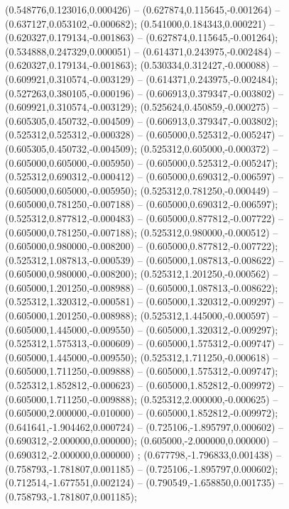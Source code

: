  (0.548776,0.123016,0.000426) -- (0.627874,0.115645,-0.001264) -- (0.637127,0.053102,-0.000682);
 (0.541000,0.184343,0.000221) -- (0.620327,0.179134,-0.001863) -- (0.627874,0.115645,-0.001264);
 (0.534888,0.247329,0.000051) -- (0.614371,0.243975,-0.002484) -- (0.620327,0.179134,-0.001863);
 (0.530334,0.312427,-0.000088) -- (0.609921,0.310574,-0.003129) -- (0.614371,0.243975,-0.002484);
 (0.527263,0.380105,-0.000196) -- (0.606913,0.379347,-0.003802) -- (0.609921,0.310574,-0.003129);
 (0.525624,0.450859,-0.000275) -- (0.605305,0.450732,-0.004509) -- (0.606913,0.379347,-0.003802);
 (0.525312,0.525312,-0.000328) -- (0.605000,0.525312,-0.005247) -- (0.605305,0.450732,-0.004509);
 (0.525312,0.605000,-0.000372) -- (0.605000,0.605000,-0.005950) -- (0.605000,0.525312,-0.005247);
 (0.525312,0.690312,-0.000412) -- (0.605000,0.690312,-0.006597) -- (0.605000,0.605000,-0.005950);
 (0.525312,0.781250,-0.000449) -- (0.605000,0.781250,-0.007188) -- (0.605000,0.690312,-0.006597);
 (0.525312,0.877812,-0.000483) -- (0.605000,0.877812,-0.007722) -- (0.605000,0.781250,-0.007188);
 (0.525312,0.980000,-0.000512) -- (0.605000,0.980000,-0.008200) -- (0.605000,0.877812,-0.007722);
 (0.525312,1.087813,-0.000539) -- (0.605000,1.087813,-0.008622) -- (0.605000,0.980000,-0.008200);
 (0.525312,1.201250,-0.000562) -- (0.605000,1.201250,-0.008988) -- (0.605000,1.087813,-0.008622);
 (0.525312,1.320312,-0.000581) -- (0.605000,1.320312,-0.009297) -- (0.605000,1.201250,-0.008988);
 (0.525312,1.445000,-0.000597) -- (0.605000,1.445000,-0.009550) -- (0.605000,1.320312,-0.009297);
 (0.525312,1.575313,-0.000609) -- (0.605000,1.575312,-0.009747) -- (0.605000,1.445000,-0.009550);
 (0.525312,1.711250,-0.000618) -- (0.605000,1.711250,-0.009888) -- (0.605000,1.575312,-0.009747);
 (0.525312,1.852812,-0.000623) -- (0.605000,1.852812,-0.009972) -- (0.605000,1.711250,-0.009888);
 (0.525312,2.000000,-0.000625) -- (0.605000,2.000000,-0.010000) -- (0.605000,1.852812,-0.009972);
 (0.641641,-1.904462,0.000724) -- (0.725106,-1.895797,0.000602) -- (0.690312,-2.000000,0.000000);
 (0.605000,-2.000000,0.000000) -- (0.690312,-2.000000,0.000000) ;
 (0.677798,-1.796833,0.001438) -- (0.758793,-1.781807,0.001185) -- (0.725106,-1.895797,0.000602);
 (0.712514,-1.677551,0.002124) -- (0.790549,-1.658850,0.001735) -- (0.758793,-1.781807,0.001185);
